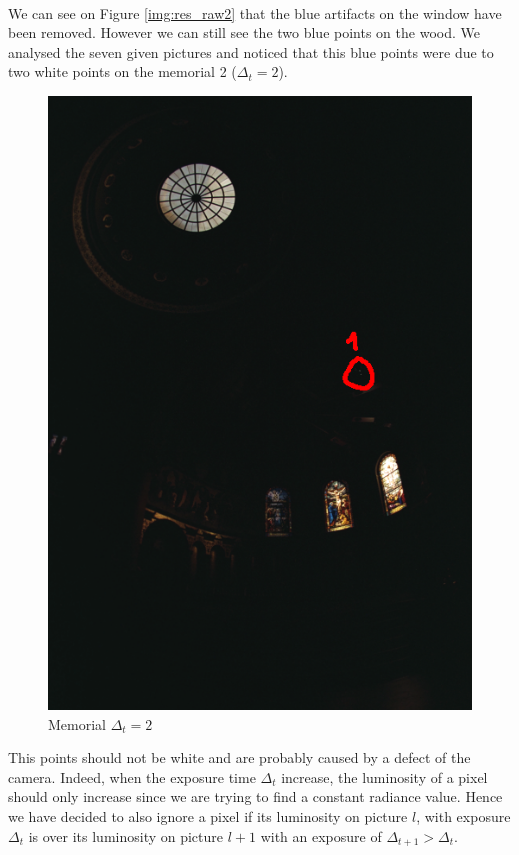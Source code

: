 \documentclass[a4paper,12pt,oneside,final]{report}
\begin{document}
\paragraph{}
We can see on Figure \ref{img:res_raw2} that the blue artifacts on the window have been removed. However we can still see the two blue points on the wood. We analysed the seven given pictures and noticed that this blue points were due to two white points on the memorial 2 ($\Delta_t=2$).
\begin{figure}[!h]
\centering
\includegraphics[scale=0.5]{pictures/memorial2.png}
\caption{Memorial $\Delta_t=2$}
\end{figure}
\cleardoublepage
This points should not be white and are probably caused by a defect of the camera. Indeed, when the exposure time $\Delta_t$ increase, the luminosity of a pixel should only increase since we are trying to find a constant radiance value. Hence we have decided to also ignore a pixel if its luminosity on picture $l$, with exposure $\Delta_t$ is over its luminosity on picture $l+1$ with an exposure of $\Delta_{t+1}>\Delta_t$.
\end{document}
